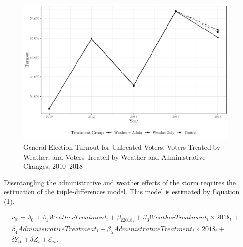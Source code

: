 \documentclass[
  12pt,
]{article}
\begin{document}
\begin{figure}[h]

{\centering \includegraphics{hurricane_michael_files/figure-latex/tripd-to-chunk-1} 

}

\caption{\label{fig:trip-diff-plot}General Election Turnout for Untreated Voters, Voters Treated by Weather, and Voters Treated by Weather and Administrative Changes, 2010--2018}\label{fig:tripd-to-chunk}
\end{figure}

Disentangling the administrative and weather effects of the storm requires the estimation of the triple-differences model. This model is estimated by Equation (1).

\begin{gather}
\label{eq:1}
v_{it}=\beta_0+\beta_1Weather Treatment_{i}+\beta_22018_{t}+\beta_3Weather Treatment_{i}\times 2018_{t} + \nonumber \\
\beta_4Administrative Treatment_{i} + \beta_5Administrative Treatment_{i}\times 2018_{t} + \\
\delta{Y}_{it} + \delta{Z}_{i} + \mathcal{E}_{it}. \nonumber
\end{gather}
\end{document}
